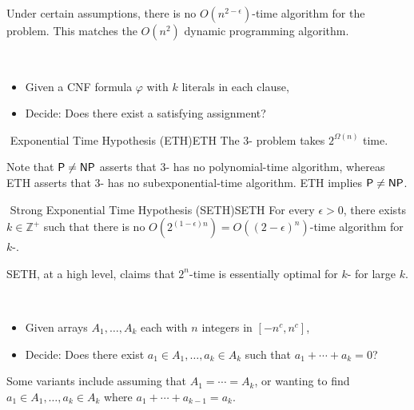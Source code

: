         \begin{example}
            Under certain assumptions, there is no \(O(n^{2-\epsilon})\)-time algorithm for the  problem. This matches the \(O(n^2)\) dynamic programming algorithm.
        \end{example}
        \pagebreak
        \begin{compprob} \label{prob:ksat}
            \vphantom
            \\
            \begin{itemize}
                \item Given a CNF formula \(\varphi\) with \(k\) literals in each clause,
                \item Decide: Does there exist a satisfying assignment?
            \end{itemize}
        \end{compprob}
        \begin{hypothesis}{\Stop\,\,Exponential Time Hypothesis (ETH)}{ETH}
            The \(3\)- problem takes \(2^{\Omega(n)}\) time.
        \end{hypothesis}
        \begin{remark*}
            Note that \(\mathsf{P}\neq\mathsf{NP}\) asserts that \(3\)- has no polynomial-time algorithm, whereas ETH asserts that \(3\)- has no subexponential-time algorithm. ETH implies \(\mathsf{P}\neq\mathsf{NP}\).
        \end{remark*}
        \begin{hypothesis}{\Stop\,\,Strong Exponential Time Hypothesis (SETH)}{SETH}
            For every \(\epsilon>0\), there exists \(k\in\mathbb{Z}^+\) such that there is no \(O\left(2^{(1-\epsilon)n}\right)=O((2-\epsilon)^n)\)-time algorithm for \(k\)-.
        \end{hypothesis}
        \begin{remark*}
            SETH, at a high level, claims that \(2^n\)-time is essentially optimal for \(k\)- for large \(k\).
        \end{remark*}
        \begin{compprob} \label{prob:ksum}
            \vphantom
            \\
            \begin{itemize}
                \item Given arrays \(A_1,\ldots,A_k\) each with \(n\) integers in \([-n^c,n^c]\),
                \item Decide: Does there exist \(a_1\in A_1,\ldots, a_k\in A_k\) such that \(a_1+\cdots+a_k=0\)?
            \end{itemize}
            Some variants include assuming that \(A_1=\cdots=A_k\), or wanting to find \(a_1\in A_1,\ldots, a_k\in A_k\) where \(a_1+\cdots+a_{k-1}=a_k\).
        \end{compprob}
